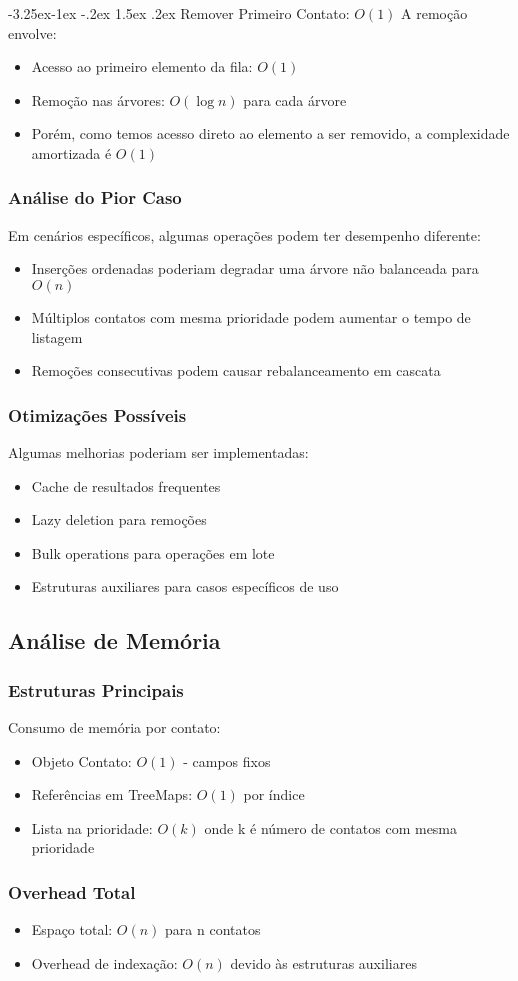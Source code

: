 \documentclass{article}
\makeatletter
\renewcommand\paragraph{\@startsection{paragraph}{4}{\z@}%
  {-3.25ex\@plus -1ex \@minus -.2ex}%
  {1.5ex \@plus .2ex}%
  {\normalfont\normalsize\bfseries}}
\makeatother
\begin{document}
\paragraph{Remover Primeiro Contato: $O(1)$}
A remoção envolve:
\begin{itemize}
    \item Acesso ao primeiro elemento da fila: $O(1)$
    \item Remoção nas árvores: $O(\log n)$ para cada árvore
    \item Porém, como temos acesso direto ao elemento a ser removido, a complexidade amortizada é $O(1)$
\end{itemize}

\subsubsection{Análise do Pior Caso}
Em cenários específicos, algumas operações podem ter desempenho diferente:
\begin{itemize}
    \item Inserções ordenadas poderiam degradar uma árvore não balanceada para $O(n)$
    \item Múltiplos contatos com mesma prioridade podem aumentar o tempo de listagem
    \item Remoções consecutivas podem causar rebalanceamento em cascata
\end{itemize}

\subsubsection{Otimizações Possíveis}
Algumas melhorias poderiam ser implementadas:
\begin{itemize}
    \item Cache de resultados frequentes
    \item Lazy deletion para remoções
    \item Bulk operations para operações em lote
    \item Estruturas auxiliares para casos específicos de uso
\end{itemize}

\subsection{Análise de Memória}
\subsubsection{Estruturas Principais}
Consumo de memória por contato:
\begin{itemize}
    \item Objeto Contato: $O(1)$ - campos fixos
    \item Referências em TreeMaps: $O(1)$ por índice
    \item Lista na prioridade: $O(k)$ onde k é número de contatos com mesma prioridade
\end{itemize}

\subsubsection{Overhead Total}
\begin{itemize}
    \item Espaço total: $O(n)$ para n contatos
    \item Overhead de indexação: $O(n)$ devido às estruturas auxiliares
\end{itemize}
\end{document}
